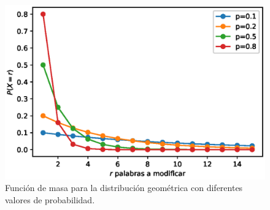 \begin{figure}[ht]
    \includegraphics[width=\textwidth]{sections/figures/geometric_pmf.eps}
    \caption{Función de masa para la distribución geométrica con diferentes valores de probabilidad.}
    \label{fig:geom}
\end{figure}
